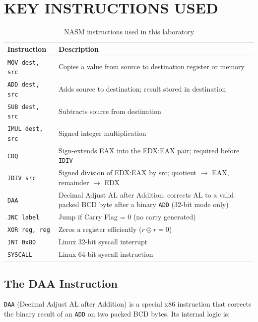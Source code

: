 \documentclass[12pt,a4paper]{article}
\begin{document}
\newpage
\section{KEY INSTRUCTIONS USED}

\begin{table}[H]
\centering
\caption{NASM instructions used in this laboratory}
\small
\begin{tabular}{|l|p{9.5cm}|}
\hline
\textbf{Instruction} & \textbf{Description} \\
\hline
\texttt{MOV dest, src} & Copies a value from source to destination register or memory \\
\hline
\texttt{ADD dest, src} & Adds source to destination; result stored in destination \\
\hline
\texttt{SUB dest, src} & Subtracts source from destination \\
\hline
\texttt{IMUL dest, src} & Signed integer multiplication \\
\hline
\texttt{CDQ} & Sign-extends EAX into the EDX:EAX pair; required before \texttt{IDIV} \\
\hline
\texttt{IDIV src} & Signed division of EDX:EAX by src; quotient $\to$ EAX, remainder $\to$ EDX \\
\hline
\texttt{DAA} & Decimal Adjust AL after Addition; corrects AL to a valid packed BCD byte
after a binary \texttt{ADD} (32-bit mode only) \\
\hline
\texttt{JNC label} & Jump if Carry Flag = 0 (no carry generated) \\
\hline
\texttt{XOR reg, reg} & Zeros a register efficiently ($r \oplus r = 0$) \\
\hline
\texttt{INT 0x80} & Linux 32-bit syscall interrupt \\
\hline
\texttt{SYSCALL} & Linux 64-bit syscall instruction \\
\hline
\end{tabular}
\end{table}

\subsection{The DAA Instruction}

\texttt{DAA} (Decimal Adjust AL after Addition) is a special x86 instruction that
corrects the binary result of an \texttt{ADD} on two packed BCD bytes.  Its internal
logic is:
\end{document}
